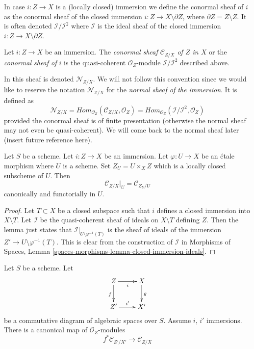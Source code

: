 \medskip\noindent
In case $i : Z \to X$ is a (locally closed) immersion we define the
conormal sheaf of $i$ as the conormal sheaf of the closed
immersion $i : Z \to X \setminus \partial Z$, where
$\partial Z = \overline{Z} \setminus Z$. It is often denoted
$\mathcal{I}/\mathcal{I}^2$ where $\mathcal{I}$ is the ideal sheaf
of the closed immersion $i : Z \to X \setminus \partial Z$.

\begin{definition}
\label{definition-conormal-sheaf}
Let $i : Z \to X$ be an immersion. The {\it conormal sheaf
$\mathcal{C}_{Z/X}$ of $Z$ in $X$} or the {\it conormal sheaf of $i$}
is the quasi-coherent $\mathcal{O}_Z$-module $\mathcal{I}/\mathcal{I}^2$
described above.
\end{definition}

\noindent
In \cite[IV Definition 16.1.2]{EGA} this sheaf is denoted
$\mathcal{N}_{Z/X}$. We will not follow this convention since we would
like to reserve the notation $\mathcal{N}_{Z/X}$
for the {\it normal sheaf of the immersion}. It is defined as
$$
\mathcal{N}_{Z/X} =
\textit{Hom}_{\mathcal{O}_Z}(\mathcal{C}_{Z/X}, \mathcal{O}_Z) =
\textit{Hom}_{\mathcal{O}_Z}(\mathcal{I}/\mathcal{I}^2, \mathcal{O}_Z)
$$
provided the conormal sheaf is of finite presentation (otherwise the
normal sheaf may not even be quasi-coherent). We will come back to the
normal sheaf later (insert future reference here).

\begin{lemma}
\label{lemma-etale-conormal}
Let $S$ be a scheme. Let $i : Z \to X$ be an immersion.
Let $\varphi : U \to X$ be an \'etale morphism where $U$ is a scheme.
Set $Z_U = U \times_X Z$ which is a locally closed subscheme of $U$.
Then
$$
\mathcal{C}_{Z/X}|_U = \mathcal{C}_{Z_U/U}
$$
canonically and functorially in $U$.
\end{lemma}

\begin{proof}
Let $T \subset X$ be a closed subspace such that $i$ defines a closed
immersion into $X \setminus T$.
Let $\mathcal{I}$ be the quasi-coherent sheaf of ideals on
$X \setminus T$ defining $Z$. Then the lemma just states that
$\mathcal{I}|_{U \setminus \varphi^{-1}(T)}$ is the sheaf of ideals of
the immersion $Z' \to U \setminus \varphi^{-1}(T)$.
This is clear from the construction of $\mathcal{I}$ in
Morphisms of Spaces, Lemma \ref{spaces-morphisms-lemma-closed-immersion-ideals}.
\end{proof}

\begin{lemma}
\label{lemma-conormal-functorial}
Let $S$ be a scheme. Let
$$
\xymatrix{
Z \ar[r]_i \ar[d]_f & X \ar[d]^g \\
Z' \ar[r]^{i'} & X'
}
$$
be a commutative diagram of algebraic spaces over $S$.
Assume $i$, $i'$ immersions. There is a canonical map
of $\mathcal{O}_Z$-modules
$$
f^*\mathcal{C}_{Z'/X'}
\longrightarrow
\mathcal{C}_{Z/X}
$$
\end{lemma}

